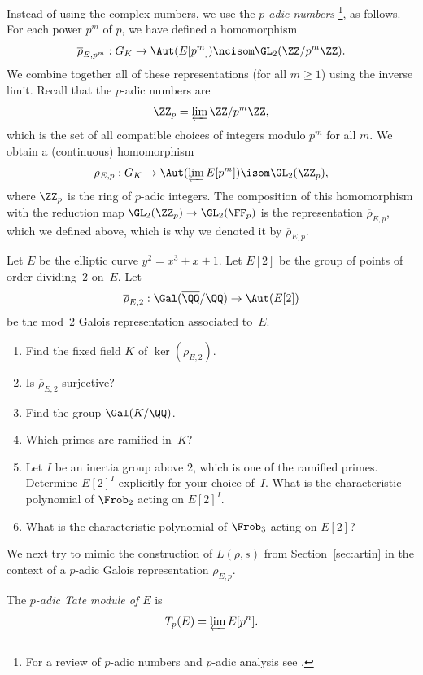 Instead of using the complex numbers, we use the \emph{$p$-adic numbers}
\footnote{
  For a review of $p$-adic numbers and $p$-adic analysis
  see \cite{koblitz1996p}.
}, as follows. For each power $p^m$ of $p$, we have defined a homomorphism
\[
  \overline{\rho}_{E,p^m}: G_K \to \Aut(E[p^m]) \ncisom \GL_2(\ZZ/p^m\ZZ).
\]
We combine together all of these representations (for all $m\geq 1$)
using the inverse limit.
Recall that the $p$-adic numbers are
\[
  \ZZ_p = \varprojlim \ZZ/p^m\ZZ,
\]
which is the set of all compatible choices of integers modulo $p^m$ for
all $m$.
We obtain a (continuous) homomorphism
\[
  \rho_{E,p}: G_K \to \Aut(\varprojlim E[p^m]) \isom \GL_2(\ZZ_p),
\]
where $\ZZ_p$ is the ring of $p$-adic integers.  The composition of
this homomorphism with the reduction map $\GL_2(\ZZ_p) \to \GL_2(\FF_p)$
is the representation $\overline{\rho}_{E,p}$, which we defined above, which
is why we denoted it by $\overline{\rho}_{E,p}$.

\begin{exercise}
  Let $E$ be the elliptic curve $y^2=x^3+x+1$.  Let
  $E[2]$  be the group of points of order dividing~$2$ on~$E$.  Let
  \[
    \overline{\rho}_{E,2}:\Gal(\overline{\QQ}/\QQ) \to \Aut(E[2])
  \]
  be the mod~$2$ Galois representation associated to~$E$.
  \begin{enumerate}[label=(\alph*)]
    \item Find the fixed field $K$ of $\ker(\overline{\rho}_{E,2})$.
    \item Is $\overline{\rho}_{E,2}$ surjective?
    \item Find the group $\Gal(K/\QQ)$.
    \item Which primes are ramified in~$K$?
    \item Let $I$ be an inertia group above $2$, which is one of the ramified
    primes. Determine $E[2]^I$ explicitly for your choice of~$I$. What is the
    characteristic polynomial of $\Frob_2$ acting on $E[2]^I$.
    \item What is the characteristic polynomial of $\Frob_3$ acting
    on $E[2]$?
  \end{enumerate}
\end{exercise}

We next try to mimic the construction of $L(\rho,s)$ from
Section~\ref{sec:artin} in the context of a $p$-adic Galois
representation $\rho_{E,p}$.

\begin{definition}
  The \emph{$p$-adic Tate module of $E$} is
  \[
    T_p(E) = \varprojlim E[p^n].
  \]
\end{definition}

